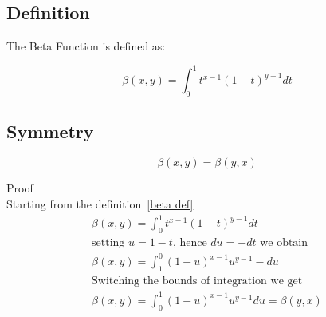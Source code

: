 \documentclass[a4paper]{article}
\begin{document}
    \subsection{Definition}\label{subsec:definition2}
    The Beta Function is defined as:
    \begin{definition}
        \label{beta def}
        \[
        \beta(x, y) = \int_{0}^{1} t^{x-1} (1-t)^{y-1} dt
        \]
    \end{definition}

    \subsection{Symmetry}\label{subsec:symmetry}
    \begin{theorem}
        \begin{equation}
            \beta(x, y) = \beta(y, x) \label{eq:equation23}
        \end{equation}

        Proof
        \\
        Starting from the definition~\ref{beta def}
        \begin{gather*}
            \beta(x, y) = \int_{0}^{1} t^{x-1} (1-t)^{y-1} dt
            \\
            \text{setting $u = 1-t$, hence $du = -dt$ we obtain}
            \\
            \beta(x, y) = \int_{1}^{0} (1-u)^{x-1} {u}^{y-1} -du
            \\
            \text{Switching the bounds of integration we get}
            \\
            \beta(x, y) = \int_{0}^{1} (1-u)^{x-1} {u}^{y-1} du = \beta(y, x)
        \end{gather*}
    \end{theorem}
\end{document}
